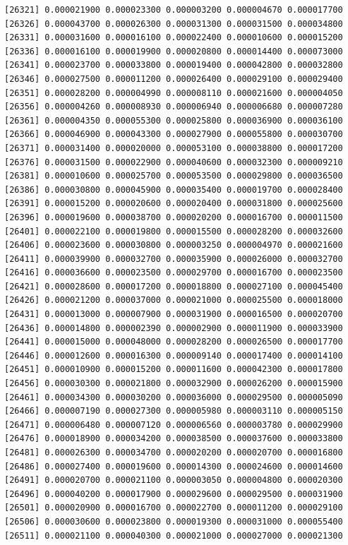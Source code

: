 \documentclass[]{article}
\begin{document}
\begin{verbatim}
[26321] 0.000021900 0.000023300 0.000003200 0.000004670 0.000017700
[26326] 0.000043700 0.000026300 0.000031300 0.000031500 0.000034800
[26331] 0.000031600 0.000016100 0.000022400 0.000010600 0.000015200
[26336] 0.000016100 0.000019900 0.000020800 0.000014400 0.000073000
[26341] 0.000023700 0.000033800 0.000019400 0.000042800 0.000032800
[26346] 0.000027500 0.000011200 0.000026400 0.000029100 0.000029400
[26351] 0.000028200 0.000004990 0.000008110 0.000021600 0.000004050
[26356] 0.000004260 0.000008930 0.000006940 0.000006680 0.000007280
[26361] 0.000004350 0.000055300 0.000025800 0.000036900 0.000036100
[26366] 0.000046900 0.000043300 0.000027900 0.000055800 0.000030700
[26371] 0.000031400 0.000020000 0.000053100 0.000038800 0.000017200
[26376] 0.000031500 0.000022900 0.000040600 0.000032300 0.000009210
[26381] 0.000010600 0.000025700 0.000053500 0.000029800 0.000036500
[26386] 0.000030800 0.000045900 0.000035400 0.000019700 0.000028400
[26391] 0.000015200 0.000020600 0.000020400 0.000031800 0.000025600
[26396] 0.000019600 0.000038700 0.000020200 0.000016700 0.000011500
[26401] 0.000022100 0.000019800 0.000015500 0.000028200 0.000032600
[26406] 0.000023600 0.000030800 0.000003250 0.000004970 0.000021600
[26411] 0.000039900 0.000032700 0.000035900 0.000026000 0.000032700
[26416] 0.000036600 0.000023500 0.000029700 0.000016700 0.000023500
[26421] 0.000028600 0.000017200 0.000018800 0.000027100 0.000045400
[26426] 0.000021200 0.000037000 0.000021000 0.000025500 0.000018000
[26431] 0.000013000 0.000007900 0.000031900 0.000016500 0.000020700
[26436] 0.000014800 0.000002390 0.000002900 0.000011900 0.000033900
[26441] 0.000015000 0.000048000 0.000028200 0.000026500 0.000017700
[26446] 0.000012600 0.000016300 0.000009140 0.000017400 0.000014100
[26451] 0.000010900 0.000015200 0.000011600 0.000042300 0.000017800
[26456] 0.000030300 0.000021800 0.000032900 0.000026200 0.000015900
[26461] 0.000034300 0.000030200 0.000036000 0.000029500 0.000005090
[26466] 0.000007190 0.000027300 0.000005980 0.000003110 0.000005150
[26471] 0.000006480 0.000007120 0.000006560 0.000003780 0.000029900
[26476] 0.000018900 0.000034200 0.000038500 0.000037600 0.000033800
[26481] 0.000026300 0.000034700 0.000020200 0.000020700 0.000016800
[26486] 0.000027400 0.000019600 0.000014300 0.000024600 0.000014600
[26491] 0.000020700 0.000021100 0.000003050 0.000004800 0.000020300
[26496] 0.000040200 0.000017900 0.000029600 0.000029500 0.000031900
[26501] 0.000020900 0.000016700 0.000022700 0.000011200 0.000029100
[26506] 0.000030600 0.000023800 0.000019300 0.000031000 0.000055400
[26511] 0.000021100 0.000040300 0.000021000 0.000027000 0.000021300

\end{verbatim}
\end{document}
